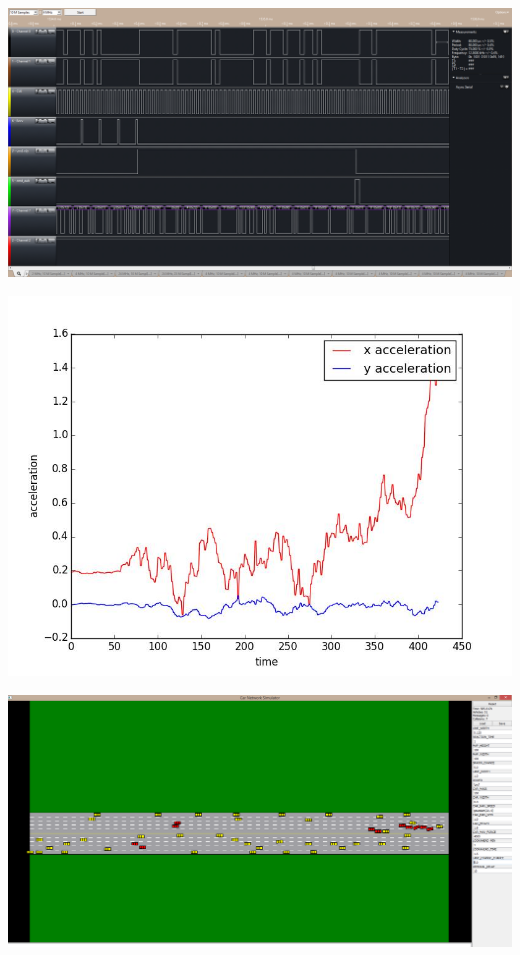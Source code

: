 \documentclass[a0,landscape]{a0poster}
\begin{document}
\begin{multicols}{3}
\includegraphics[width=0.9\linewidth]{UART-CAN_PacketTranslation}
\\

\centerline{\includegraphics[scale=0.7]{imu_plot2}}


\includegraphics[width=1\linewidth]{car_sim}




\end{multicols}
\end{document}
